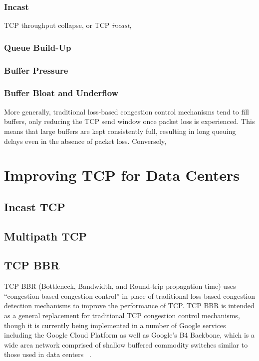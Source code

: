 \subsubsection{Incast}

TCP throughput collapse, or TCP \emph{incast},  

\subsubsection{Queue Build-Up}

\subsubsection{Buffer Pressure}

\subsubsection{Buffer Bloat and Underflow}

More generally, traditional loss-based congestion control mechanisms tend to fill buffers, only reducing the TCP send window once packet loss is experienced. This means that large buffers are kept consistently full, resulting in long queuing delays even in the absence of packet loss. Conversely,  

\section{Improving TCP for Data Centers}

\subsection{Incast TCP}

\subsection{Multipath TCP}

\subsection{TCP BBR}

TCP BBR (Bottleneck, Bandwidth, and Round-trip propagation time) uses ``congestion-based congestion control'' in place of traditional loss-based congestion detection mechanisms to improve the performance of TCP. TCP BBR is intended as a general replacement for traditional TCP congestion control mechanisms, though it is currently being implemented in a number of Google services including the Google Cloud Platform as well as Google's B4 Backbone, which is a wide area network comprised of shallow buffered commodity switches similar to those used in data centers ~\cite{cardwell_bbr:_2016, cardwell_tcp_2017}. 


